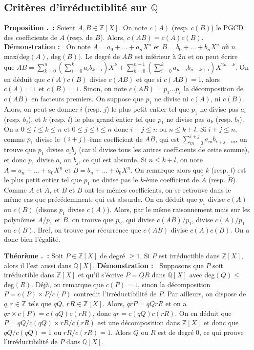 \documentclass[5pt,a4paper]{article}
\newcounter{prop}[section]
\newcounter{thm}[section]
\renewcommand{\theprop}{\thesection.\arabic{prop}}
\renewcommand{\thethm}{\thesection.\arabic{thm}}
\newcommand{\prop}[1]{\stepcounter{prop}\noindent\textbf{Proposition \theprop ~:} #1 \newline}
\newcommand{\thm}[1]{\stepcounter{thm}\noindent\textbf{Théorème \thethm ~:} #1 \newline}
\newcommand{\demo}[1]{\textbf{Démonstration :~} #1 \newline}
\begin{document}
\begin{onehalfspacing}
\subsection{Critères d'irréductiblité sur $\mathbb{Q}$}

\prop{Soient $A, B \in \mathbb{Z}[X]$. On note $c(A)$ (resp. $c(B)$) le PGCD des coefficients de $A$ (resp. de $B$). Alors, $c(AB) = c(A)c(B)$.}
\demo{On note $A = a_0 + ... + a_nX^n$ et $B = b_0 + ... + b_nX^n$ où $n = $ max$($deg$(A)$, deg$(B))$. Le degré de $AB$ est inférieur à $2n$ et on peut écrire que $AB =  \displaystyle{\sum_{k = 0}^{n}} (\sum_{i = 0}^k a_ib_{k - i})X^k + \sum_{k = 0}^{n - 1} (\sum_{i = 0}^k a_{n - i}b_{n - k + i})X^{2n - k}$. On en déduit que $c(A)c(B)$ divise $c(AB)$ et que si $c(AB) = 1$, alors $c(A) = 1$ et $c(B) = 1$. Sinon, on note $c(AB) = p_1...p_r$ la décomposition de $c(AB)$ en facteurs premiers. On suppose que $p_1$ ne divise ni $c(A)$, ni $c(B)$. Alors, on peut se donner $i$ (resp. $j$) le plus petit entier tel que $p_1$ ne divise pas $a_i$ (resp. $b_j$), et $k$ (resp. $l$) le plus grand entier tel que $p_1$ ne divise pas $a_k$ (resp. $b_l$). On a $0 \leq i \leq k \leq n$ et $0 \leq j \leq l \leq n$ donc $i+j \leq n$ ou $n \leq k+l$. Si $i+j \leq n$, comme $p_1$ divise le $(i+j)$-ème coefficient de $AB$, qui est $\displaystyle{\sum_{m = 0}^{i+j}} a_mb_{i + j - m}$, on trouve que $p_1$ divise $a_ib_j$ (car il divise tous les autres coefficients de cette somme), et donc $p_1$ divise $a_i$ ou $b_j$, ce qui est absurde. Si $n \leq k+l$, on note $\tilde{A} = a_n + ... + a_0X^n$ et $\tilde{B} = b_n + ... + b_0X^n$. On remarque alors que $k$ (resp. $l$) est le plus petit entier tel que $p_1$ ne divise pas le $k$-ème coefficient de $\tilde{A}$ (resp. $\tilde{B}$). Comme $A$ et $\tilde{A}$, et $B$ et $\tilde{B}$ ont les mêmes coefficients, on se retrouve dans le même cas que précédemment, qui est absurde. On en déduit que $p_1$ divise $c(A)$ ou $c(B)$ (disons $p_1$ divise $c(A)$). Alors, par le même raisonnement mais sur les polynômes $A/p_1$ et $B$, on trouve que $p_2$, qui divise $c(AB)/p_1$, divise $c(A)/p_1$ ou $c(B)$. Bref, on trouve par récurrence que $c(AB)$ divise $c(A)c(B)$. On a donc bien l'égalité.}

\thm{Soit $P \in \mathbb{Z}[X]$ de degré $\geq 1$. Si $P$ est irréductible dans $\mathbb{Z}[X]$, alors il l'est aussi dans $\mathbb{Q}[X]$.}
\demo{Supposons que $P$ soit irréductible dans $\mathbb{Z}[X]$ et qu'il s'écrive $P = QR$ dans $\mathbb{Q}[X]$ avec deg$(Q) \leq$ deg$(R)$. Déjà, on remarque que $c(P) = 1$, sinon la décomposition $P = c(P) \times P/c(P)$ contredit l'irréductibilité de $P$. Par ailleurs, on dispose de $q, r \in \mathbb{Z}$ tels que $qQ,~rR \in \mathbb{Z}[X]$. Alors, $qrP = qQrR$ et on a $qr \times c(P) = c(qQ)c(rR)$, donc $qr = c(qQ)c(rR)$. On en déduit que $P = qQ/c(qQ) \times rR/c(rR)$ est une décomposition dans $\mathbb{Z}[X]$ et donc que $qQ/c(qQ) = 1$ ou $rR/c(rR) = 1$. Alors $Q$ ou $R$ est de degré $0$, ce qui prouve l'irréductibilité de $P$ dans $\mathbb{Q}[X]$.}


\end{onehalfspacing}
\end{document}
